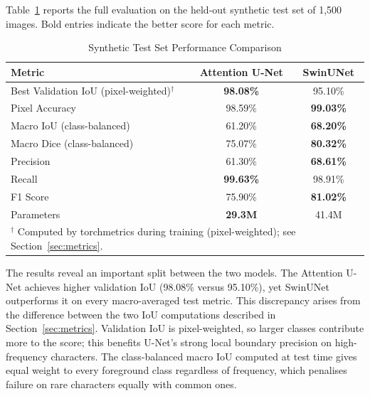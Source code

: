 \documentclass[a4paper,11pt]{article}
\begin{document}
Table~\ref{tab:synthetic_results} reports the full evaluation on the held-out synthetic
test set of 1,500 images. Bold entries indicate the better score for each metric.

\begin{table}[H]
\centering
\caption{Synthetic Test Set Performance Comparison}
\label{tab:synthetic_results}
\begin{tabular}{lcc}
\toprule
\textbf{Metric} & \textbf{Attention U-Net} & \textbf{SwinUNet} \\
\midrule
Best Validation IoU (pixel-weighted)$^\dagger$ & \textbf{98.08\%} & 95.10\% \\
Pixel Accuracy                                 & 98.59\%          & \textbf{99.03\%} \\
Macro IoU (class-balanced)                     & 61.20\%          & \textbf{68.20\%} \\
Macro Dice (class-balanced)                    & 75.07\%          & \textbf{80.32\%} \\
Precision                                      & 61.30\%          & \textbf{68.61\%} \\
Recall                                         & \textbf{99.63\%} & 98.91\% \\
F1 Score                                       & 75.90\%          & \textbf{81.02\%} \\
Parameters                                     & \textbf{29.3M}   & 41.4M \\
\bottomrule
\multicolumn{3}{l}{$^\dagger$ Computed by torchmetrics during training (pixel-weighted);
see Section~\ref{sec:metrics}.} \\
\end{tabular}
\end{table}

The results reveal an important split between the two models. The Attention U-Net achieves
higher validation IoU (98.08\% versus 95.10\%), yet SwinUNet outperforms it on every
macro-averaged test metric. This discrepancy arises from the difference between the two
IoU computations described in Section~\ref{sec:metrics}. Validation IoU is
pixel-weighted, so larger classes contribute more to the score; this benefits U-Net's
strong local boundary precision on high-frequency characters. The class-balanced macro IoU
computed at test time gives equal weight to every foreground class regardless of
frequency, which penalises failure on rare characters equally with common ones.
\end{document}
